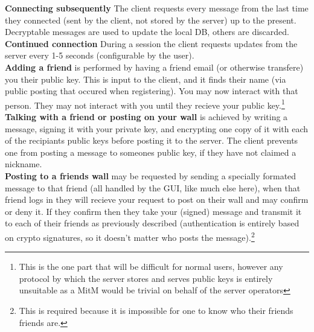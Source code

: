 \textbf{Connecting subsequently} The client requests every message from the last
time they connected (sent by the client, not stored by the server) up to the
present. Decryptable messages are used to update the local DB, others are
discarded.\\

\textbf{Continued connection} During a session the client requests updates from
the server every 1-5 seconds (configurable by the user).\\

\textbf{Adding a friend} is performed by having a friend email (or otherwise
transfere) you their public key. This is input to the client, and it finds their
name (via public posting that occured when registering). You may now interact
with that person. They may not interact with you until they recieve your public
key.\footnote{This is the one part that will be difficult for normal users,
however any protocol by which the server stores and serves public keys is
entirely unsuitable as a MitM would be trivial on behalf of the server
operators}\\

\textbf{Talking with a friend or posting on your wall} is achieved by writing
a message, signing it with your private key, and encrypting one copy of it with
each of the recipiants public keys before posting it to the server. The client
prevents one from posting a message to someones public key, if they have not
claimed a nickname.\\

\textbf{Posting to a friends wall} may be requested by sending a specially
formated message to that friend (all handled by the GUI, like much else here),
when that friend logs in they will recieve your request to post on their wall
and may confirm or deny it. If they confirm then they take your (signed) message
and transmit it to each of their friends as previously described (authentication
is entirely based on crypto signatures, so it doesn't matter who posts the
message).\footnote{This is required because it is impossible for one to know who
their friends friends are.}

